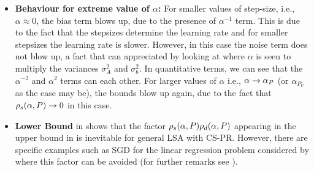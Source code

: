 \begin{itemize}[leftmargin=*, before = \leavevmode\vspace{-\baselineskip}]
\item \textbf{Behaviour for extreme value of $\alpha$:} For smaller values of step-size, i.e., $\alpha\approx 0$, the bias term blows up, due to the presence of $\alpha^{-1}$ term. This is due to the fact that the stepsizes determine the learning rate and for smaller stepsizes the learning rate is slower. However, in this case the noise term does not blow up, a fact that can appreciated by looking at  where $\alpha$ is seen to multiply the variances $\sigma^2_A$ and $\sigma^2_b$. In quantitative terms, we can see that the $\alpha^{-2}$ and $\alpha^2$ terms can each other. For larger values of $\alpha$ i.e., $\alpha\rightarrow \alpha_{P}$ (or $\alpha_{P_U}$ as the case may be), the bounds blow up again, due to the fact that $\rho_s(\alpha,P)\rightarrow 0$ in this case.
\item \textbf{Lower Bound} in  shows that the factor $\rho_s(\alpha,P)\rho_d(\alpha,P)$ appearing in the upper bound in  is inevitable for general LSA with CS-PR. However, there are specific examples such as SGD for the linear regression problem considered by \citet{bach} where this factor can be avoided (for further remarks see ).
\end{itemize}

